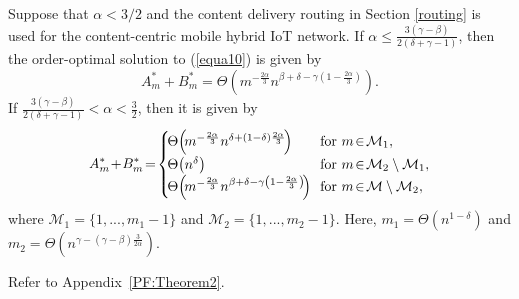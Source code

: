 \documentclass[10pt,journal,compsoc,onecolumn]{IEEEtran}
\begin{document}
\begin{thm} \label{Thm:Theorem2}
Suppose that $\alpha < 3/2$ and the content delivery routing in
Section \ref{routing} is used for the content-centric mobile hybrid IoT network. If $\alpha \leq
\frac{3(\gamma-\beta)}{2(\delta+\gamma-1)}$, then the order-optimal
solution to (\ref{equa10}) is given by
\begin{equation}
\label{equa12}
A^{*}_m+B^{*}_m=
 \Theta\left(m^{-\frac{2\alpha}{3}}n^{\beta+\delta-\gamma\left(1-\frac{2\alpha}{3}\right)}\right).\nonumber
\end{equation}
If $\frac{3(\gamma-\beta)}{2(\delta+\gamma-1)}< \alpha<\frac{3}{2}$, then it is given by
\begin{equation}
\label{equa11}A^{*}_m\!+\!B^{*}_m\!=\!
  \begin{cases}
    \!\Theta \!\left(\!m^{-\frac{2\alpha}{3}}n^{\delta+(1-\delta)\frac{2\alpha}{3}}\!\right) & \textnormal{\!\!for } m \!\in \!\mathcal{M}_1, \\
   \!\Theta\!\left(n^\delta \right) & \textnormal{\!\!for } m\!\in\!\mathcal{M}_2\setminus\mathcal{M}_1, \\
   \!\Theta\!\left(\!m^{-\frac{2\alpha}{3}}n^{\beta+\delta-\gamma\left(1-\frac{2\alpha}{3}\right)}\!\right) & \textnormal{\!\!for } m \!\in\!\mathcal{M}\setminus\mathcal{M}_2,
  \end{cases}\nonumber
\end{equation}
where $\mathcal{M}_1 = \lbrace 1,...,m_1-1 \rbrace$ and $\mathcal{M}_2 = \lbrace 1,...,m_2-1 \rbrace$. Here, $m_1=\Theta\left(n^{1-\delta}\right)$ and $m_2=\Theta\left(n^{\gamma-(\gamma-\beta)\frac{3}{2\alpha}}\right)$.
\end{thm}
\begin{IEEEproof}
Refer to Appendix~\ref{PF:Theorem2}.
\end{IEEEproof}
\end{document}
